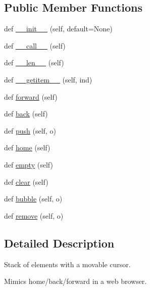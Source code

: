 \subsection*{Public Member Functions}
\begin{DoxyCompactItemize}
\item 
def \hyperlink{classmatplotlib_1_1cbook_1_1Stack_ad64dd976e7b73eb173e685562b6c09b0}{\+\_\+\+\_\+init\+\_\+\+\_\+} (self, default=None)
\item 
def \hyperlink{classmatplotlib_1_1cbook_1_1Stack_a15840f7e604923201c5c9b3e1a9970eb}{\+\_\+\+\_\+call\+\_\+\+\_\+} (self)
\item 
def \hyperlink{classmatplotlib_1_1cbook_1_1Stack_a245f37a2adadae55d8d2642ac6ac5513}{\+\_\+\+\_\+len\+\_\+\+\_\+} (self)
\item 
def \hyperlink{classmatplotlib_1_1cbook_1_1Stack_a685bff97d10e444eefc52f7c520cf57d}{\+\_\+\+\_\+getitem\+\_\+\+\_\+} (self, ind)
\item 
def \hyperlink{classmatplotlib_1_1cbook_1_1Stack_ac3b9a658495cab11c0870fedc4c8af03}{forward} (self)
\item 
def \hyperlink{classmatplotlib_1_1cbook_1_1Stack_af8c027f2cf5fb7cf88c063c4198dc382}{back} (self)
\item 
def \hyperlink{classmatplotlib_1_1cbook_1_1Stack_ac6331babc43dbdd56efc6cf378af87ca}{push} (self, o)
\item 
def \hyperlink{classmatplotlib_1_1cbook_1_1Stack_a58110f1be0b524650b7d0e79bff36f55}{home} (self)
\item 
def \hyperlink{classmatplotlib_1_1cbook_1_1Stack_a39a20a8fe56fc76af8599cd239fa19ff}{empty} (self)
\item 
def \hyperlink{classmatplotlib_1_1cbook_1_1Stack_a718219942a9e9f4f822da9fa384da57e}{clear} (self)
\item 
def \hyperlink{classmatplotlib_1_1cbook_1_1Stack_a187582c6ea3f5531c4af59044ee5f559}{bubble} (self, o)
\item 
def \hyperlink{classmatplotlib_1_1cbook_1_1Stack_ae96ba3695cd6722c4e3a0ef4966b3aa3}{remove} (self, o)
\end{DoxyCompactItemize}


\subsection{Detailed Description}
\begin{DoxyVerb}Stack of elements with a movable cursor.

Mimics home/back/forward in a web browser.
\end{DoxyVerb}
 


